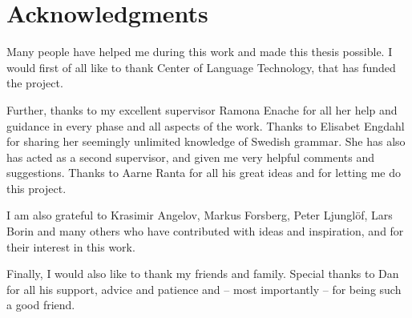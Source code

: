 \documentclass{report}
\begin{document}
{%


}

\newpage
\pagestyle{empty}
\section*{Acknowledgments}
\vspace{5mm}
Many people have helped me during this work and made this thesis possible.
I would first of all like to thank
Center of Language Technology, that has funded the project.

Further, thanks to my excellent 
supervisor Ramona Enache for all her help and guidance 
in every phase and all aspects of the work.
Thanks to Elisabet Engdahl for sharing her seemingly unlimited knowledge
of Swedish grammar. She has also has acted as a second supervisor, and given me
very helpful comments and suggestions. Thanks to Aarne Ranta for all his great
ideas and for letting me do this project.

I am also grateful to Krasimir Angelov, Markus Forsberg, Peter Ljunglöf, Lars Borin
and many others who have contributed with ideas and inspiration, and for their
interest in this work.

Finally, I would also like to thank my friends and family. Special thanks to Dan %
for all his support, advice and patience and  -- most importantly -- for being
such a good friend. %
\end{document}

